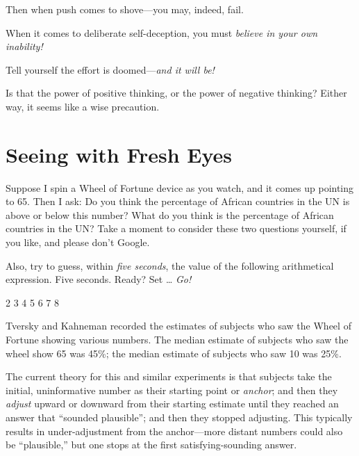 {
 Then when push comes to shove---you may, indeed, fail.}

{
 When it comes to deliberate self-deception, you must
\textit{believe in your own inability!}}

{
 Tell yourself the effort is doomed---\textit{and it will be!}}

{
 Is that the power of positive thinking, or the power of negative
thinking? Either way, it seems like a wise precaution.}

\myendsectiontext

\chapter{Seeing with Fresh Eyes}


{
 Suppose I spin a Wheel of Fortune device as you watch, and it
comes up pointing to 65. Then I ask: Do you think the percentage of
African countries in the UN is above or below this number? What do you
think is the percentage of African countries in the UN? Take a moment
to consider these two questions yourself, if you like, and please
don't Google. }

{
 Also, try to guess, within \textit{five seconds}, the value of the
following arithmetical expression. Five seconds. Ready? Set \ldots
\textit{Go!}}

{ {\texttimes} 2 {\texttimes} 3 {\texttimes} 4 {\texttimes} 5
{\texttimes} 6 {\texttimes} 7 {\texttimes} 8
\par}


\bigskip

{
 Tversky and Kahneman recorded the estimates of subjects who saw
the Wheel of Fortune showing various numbers. The
median estimate of subjects who saw the wheel show 65 was 45\%; the
median estimate of subjects who saw 10 was 25\%. }

{
 The current theory for this and similar experiments is that
subjects take the initial, uninformative number as their starting point
or \textit{anchor}; and then they \textit{adjust} upward or downward
from their starting estimate until they reached an answer that
``sounded plausible''; and then they
stopped adjusting. This typically results in under-adjustment from the
anchor---more distant numbers could also be
``plausible,'' but one stops at the
first satisfying-sounding answer.}

